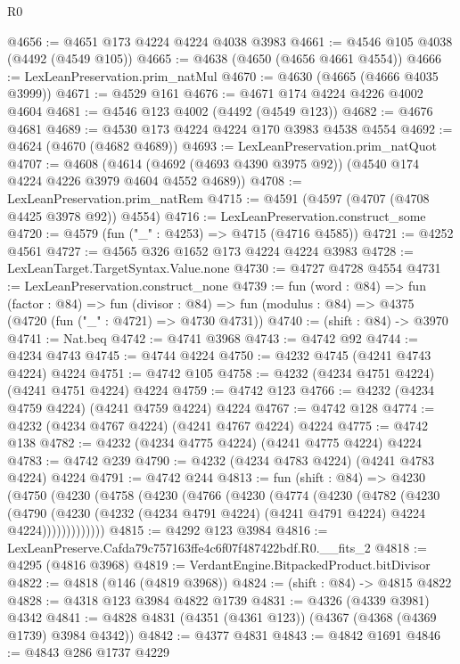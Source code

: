 \begin{lexlean}{R0}
\begin{coremodule}
@4656 := @4651 @173 @4224 @4224 @4038 @3983
@4661 := @4546 @105 @4038 (@4492 (@4549 @105))
@4665 := @4638 (@4650 (@4656 @4661 @4554))
@4666 := LexLeanPreservation.prim_natMul
@4670 := @4630 (@4665 (@4666 @4035 @3999))
@4671 := @4529 @161
@4676 := @4671 @174 @4224 @4226 @4002 @4604
@4681 := @4546 @123 @4002 (@4492 (@4549 @123))
@4682 := @4676 @4681
@4689 := @4530 @173 @4224 @4224 @170 @3983 @4538 @4554
@4692 := @4624 (@4670 (@4682 @4689))
@4693 := LexLeanPreservation.prim_natQuot
@4707 := @4608
    (@4614 (@4692 (@4693 @4390 @3975 @92)) (@4540 @174 @4224 @4226 @3979 @4604 @4552 @4689))
@4708 := LexLeanPreservation.prim_natRem
@4715 := @4591 (@4597 (@4707 (@4708 @4425 @3978 @92)) @4554)
@4716 := LexLeanPreservation.construct_some
@4720 := @4579 (fun ("_" : @4253) => @4715 (@4716 @4585))
@4721 := @4252 @4561
@4727 := @4565 @326 @1652 @173 @4224 @4224 @3983
@4728 := LexLeanTarget.TargetSyntax.Value.none
@4730 := @4727 @4728 @4554
@4731 := LexLeanPreservation.construct_none
@4739 := fun (word : @84) =>
  fun (factor : @84) =>
  fun (divisor : @84) => fun (modulus : @84) => @4375 (@4720 (fun ("_" : @4721) => @4730 @4731))
@4740 := (shift : @84) -> @3970
@4741 := Nat.beq
@4742 := @4741 @3968
@4743 := @4742 @92
@4744 := @4234 @4743
@4745 := @4744 @4224
@4750 := @4232 @4745 (@4241 @4743 @4224) @4224
@4751 := @4742 @105
@4758 := @4232 (@4234 @4751 @4224) (@4241 @4751 @4224) @4224
@4759 := @4742 @123
@4766 := @4232 (@4234 @4759 @4224) (@4241 @4759 @4224) @4224
@4767 := @4742 @128
@4774 := @4232 (@4234 @4767 @4224) (@4241 @4767 @4224) @4224
@4775 := @4742 @138
@4782 := @4232 (@4234 @4775 @4224) (@4241 @4775 @4224) @4224
@4783 := @4742 @239
@4790 := @4232 (@4234 @4783 @4224) (@4241 @4783 @4224) @4224
@4791 := @4742 @244
@4813 := fun (shift : @84) =>
  @4230
    (@4750
      (@4230
        (@4758
          (@4230
            (@4766
              (@4230
                (@4774
                  (@4230
                    (@4782
                      (@4230
                        (@4790
                          (@4230
                            (@4232 (@4234 @4791 @4224) (@4241 @4791 @4224) @4224 @4224)))))))))))))
@4815 := @4292 @123 @3984
@4816 := LexLeanPreserve.Cafda79c757163ffe4c6f07f487422bdf.R0.__fits_2
@4818 := @4295 (@4816 @3968)
@4819 := VerdantEngine.BitpackedProduct.bitDivisor
@4822 := @4818 (@146 (@4819 @3968))
@4824 := (shift : @84) -> @4815 @4822
@4828 := @4318 @123 @3984 @4822 @1739
@4831 := @4326 (@4339 @3981) @4342
@4841 := @4828 @4831 (@4351 (@4361 @123)) (@4367 (@4368 (@4369 @1739) @3984 @4342))
@4842 := @4377 @4831
@4843 := @4842 @1691
@4846 := @4843 @286 @1737 @4229

\end{coremodule}
\end{lexlean}
